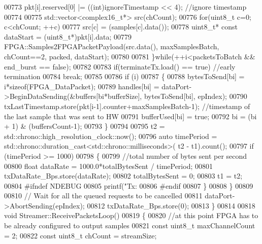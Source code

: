 \begin{DoxyCode}
{00773             pkt[i].reserved[0] |= ((int)ignoreTimestamp << 4); \textcolor{comment}{//ignore timestamp}
00774 
00775             std::vector<complex16\_t*> src(chCount);
00776             \textcolor{keywordflow}{for}(uint8\_t c=0; c<chCount; ++c)
00777                 src[c] = (samples[c].data());
00778             uint8\_t* \textcolor{keyword}{const} dataStart = (uint8\_t*)pkt[i].data;
00779             FPGA::Samples2FPGAPacketPayload(src.data(), maxSamplesBatch, chCount==2, packed, dataStart);
00780 
00781         \}\textcolor{keywordflow}{while}(++i<packetsToBatch && end\_burst == \textcolor{keyword}{false});
00782 
00783         \textcolor{keywordflow}{if}(terminateTx.load() == \textcolor{keyword}{true}) \textcolor{comment}{//early termination}
00784             \textcolor{keywordflow}{break};
00785 
00786         \textcolor{keywordflow}{if} (i)
00787         \{
00788             bytesToSend[bi] = i*\textcolor{keyword}{sizeof}(FPGA_DataPacket);
00789             handles[bi] = dataPort->BeginDataSending(&buffers[bi*bufferSize], bytesToSend[bi], epIndex);
00790             txLastTimestamp.store(pkt[i-1].counter+maxSamplesBatch-1); \textcolor{comment}{//timestamp of the last sample that
       was sent to HW}
00791             bufferUsed[bi] = \textcolor{keyword}{true};
00792             bi = (bi + 1) & (buffersCount-1);
00793         \}
00794 
00795         t2 = std::chrono::high\_resolution\_clock::now();
00796         \textcolor{keyword}{auto} timePeriod = std::chrono::duration\_cast<std::chrono::milliseconds>(
      t2 - t1).count();
00797         \textcolor{keywordflow}{if} (timePeriod >= 1000)
00798         \{
00799             \textcolor{comment}{//total number of bytes sent per second}
00800             \textcolor{keywordtype}{float} dataRate = 1000.0*totalBytesSent / timePeriod;
00801             txDataRate_Bps.store(dataRate);
00802             totalBytesSent = 0;
00803             t1 = t2;
00804 \textcolor{preprocessor}{#ifndef NDEBUG}
00805             printf(\textcolor{stringliteral}{"Tx: %
00806 \textcolor{preprocessor}{#endif}
00807         \}
00808     \}
00809 
00810     \textcolor{comment}{// Wait for all the queued requests to be cancelled}
00811     dataPort->AbortSending(epIndex);
00812     txDataRate_Bps.store(0);
00813 \}
00814 
00818 \textcolor{keywordtype}{void} Streamer::ReceivePacketsLoop()
00819 \{
00820     \textcolor{comment}{//at this point FPGA has to be already configured to output samples}
00821     \textcolor{keyword}{const} uint8\_t maxChannelCount = 2;
00822     \textcolor{keyword}{const} uint8\_t chCount = streamSize;
}}
\end{DoxyCode}
